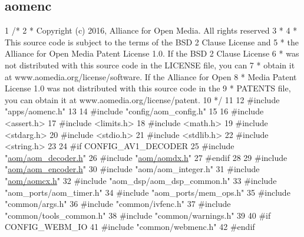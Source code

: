  \hypertarget{example_aomenc}{}\subsection{aomenc}\label{example_aomenc}

\begin{DoxyCodeInclude}
1 \textcolor{comment}{/*}
2 \textcolor{comment}{ * Copyright (c) 2016, Alliance for Open Media. All rights reserved}
3 \textcolor{comment}{ *}
4 \textcolor{comment}{ * This source code is subject to the terms of the BSD 2 Clause License and}
5 \textcolor{comment}{ * the Alliance for Open Media Patent License 1.0. If the BSD 2 Clause License}
6 \textcolor{comment}{ * was not distributed with this source code in the LICENSE file, you can}
7 \textcolor{comment}{ * obtain it at www.aomedia.org/license/software. If the Alliance for Open}
8 \textcolor{comment}{ * Media Patent License 1.0 was not distributed with this source code in the}
9 \textcolor{comment}{ * PATENTS file, you can obtain it at www.aomedia.org/license/patent.}
10 \textcolor{comment}{ */}
11 
12 \textcolor{preprocessor}{#include "apps/aomenc.h"}
13 
14 \textcolor{preprocessor}{#include "config/aom\_config.h"}
15 
16 \textcolor{preprocessor}{#include <assert.h>}
17 \textcolor{preprocessor}{#include <limits.h>}
18 \textcolor{preprocessor}{#include <math.h>}
19 \textcolor{preprocessor}{#include <stdarg.h>}
20 \textcolor{preprocessor}{#include <stdio.h>}
21 \textcolor{preprocessor}{#include <stdlib.h>}
22 \textcolor{preprocessor}{#include <string.h>}
23 
24 \textcolor{preprocessor}{#if CONFIG\_AV1\_DECODER}
25 \textcolor{preprocessor}{#include "\hyperlink{aom__decoder_8h}{aom/aom\_decoder.h}"}
26 \textcolor{preprocessor}{#include "\hyperlink{aomdx_8h}{aom/aomdx.h}"}
27 \textcolor{preprocessor}{#endif}
28 
29 \textcolor{preprocessor}{#include "\hyperlink{aom__encoder_8h}{aom/aom\_encoder.h}"}
30 \textcolor{preprocessor}{#include "aom/aom\_integer.h"}
31 \textcolor{preprocessor}{#include "\hyperlink{aomcx_8h}{aom/aomcx.h}"}
32 \textcolor{preprocessor}{#include "aom\_dsp/aom\_dsp\_common.h"}
33 \textcolor{preprocessor}{#include "aom\_ports/aom\_timer.h"}
34 \textcolor{preprocessor}{#include "aom\_ports/mem\_ops.h"}
35 \textcolor{preprocessor}{#include "common/args.h"}
36 \textcolor{preprocessor}{#include "common/ivfenc.h"}
37 \textcolor{preprocessor}{#include "common/tools\_common.h"}
38 \textcolor{preprocessor}{#include "common/warnings.h"}
39 
40 \textcolor{preprocessor}{#if CONFIG\_WEBM\_IO}
41 \textcolor{preprocessor}{#include "common/webmenc.h"}
42 \textcolor{preprocessor}{#endif}

\end{DoxyCodeInclude}

